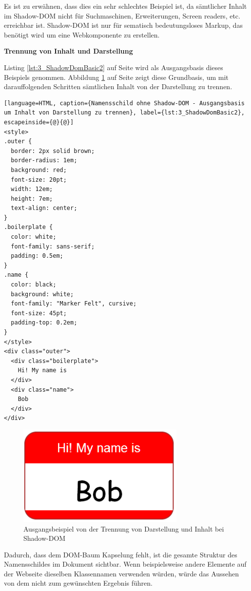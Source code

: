 Es ist zu erwähnen, dass dies ein sehr schlechtes Beispiel ist, da sämtlicher Inhalt im Shadow-DOM nicht für Suchmaschinen, Erweiterungen, Screen readers, etc. erreichbar ist. Shadow-DOM ist nur für sematisch bedeutungsloses Markup, das benötigt wird um eine Webkomponente zu erstellen.

\textbf{Trennung von Inhalt und Darstellung}

Listing \ref{lst:3_ShadowDomBasic2} auf Seite \pageref{lst:3_ShadowDomBasic2} wird als Ausgangsbasis dieses Beispiels genommen. Abbildung \ref{fig:3_ShadowDom2} auf Seite \pageref{fig:3_ShadowDom2} zeigt diese Grundbasis, um mit darauffolgenden Schritten sämtlichen Inhalt von der Darstellung zu trennen.

\begin{lstlisting}[language=HTML, caption={Namensschild ohne Shadow-DOM - Ausgangsbasis um Inhalt von Darstellung zu trennen}, label={lst:3_ShadowDomBasic2}, escapeinside={@}{@}]
<style>
.outer {
  border: 2px solid brown;
  border-radius: 1em;
  background: red;
  font-size: 20pt;
  width: 12em;
  height: 7em;
  text-align: center;
}
.boilerplate {
  color: white;
  font-family: sans-serif;
  padding: 0.5em;
}
.name {
  color: black;
  background: white;
  font-family: "Marker Felt", cursive;
  font-size: 45pt;
  padding-top: 0.2em;
}
</style>
<div class="outer">
  <div class="boilerplate">
    Hi! My name is
  </div>
  <div class="name">
    Bob
  </div>
</div>
\end{lstlisting}

\begin{figure}[h]
\centering
\includegraphics[height=5.0cm]{images/SS3.png}
\caption[
  Ausgangsbeispiel von der Trennung von Darstellung und Inhalt bei Shadow-DOM
]{Ausgangsbeispiel von der Trennung von Darstellung und Inhalt bei Shadow-DOM}
\label{fig:3_ShadowDom2}
\end{figure}

Dadurch, dass dem DOM-Baum Kapselung fehlt, ist die gesamte Struktur des Namensschildes im Dokument sichtbar. Wenn beispielsweise andere Elemente auf der Webseite dieselben Klassennamen verwenden würden, würde das Aussehen von dem nicht zum gewünschten Ergebnis führen.

